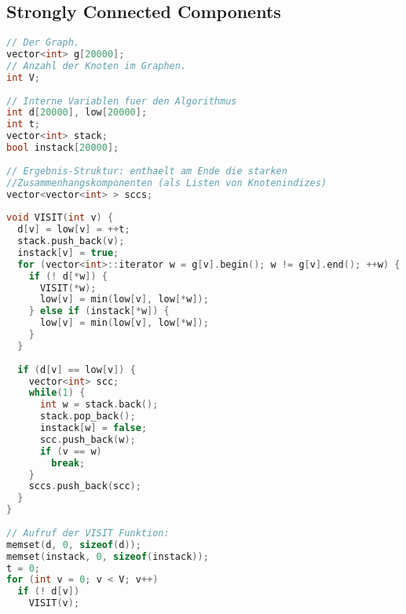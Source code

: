\subsection{Strongly Connected Components}
\begin{lstlisting}[language=C++]
// Der Graph.
vector<int> g[20000];
// Anzahl der Knoten im Graphen.
int V;
 
// Interne Variablen fuer den Algorithmus
int d[20000], low[20000];
int t;
vector<int> stack;
bool instack[20000];
 
// Ergebnis-Struktur: enthaelt am Ende die starken 
//Zusammenhangskomponenten (als Listen von Knotenindizes)
vector<vector<int> > sccs;
 
void VISIT(int v) {
  d[v] = low[v] = ++t;
  stack.push_back(v);
  instack[v] = true;
  for (vector<int>::iterator w = g[v].begin(); w != g[v].end(); ++w) {
    if (! d[*w]) {
      VISIT(*w);
      low[v] = min(low[v], low[*w]);
    } else if (instack[*w]) {
      low[v] = min(low[v], low[*w]);
    }
  }
 
  if (d[v] == low[v]) {
    vector<int> scc;
    while(1) {
      int w = stack.back();
      stack.pop_back();
      instack[w] = false;
      scc.push_back(w);
      if (v == w)
        break;
    }
    sccs.push_back(scc);
  }
}
 
// Aufruf der VISIT Funktion:
memset(d, 0, sizeof(d));
memset(instack, 0, sizeof(instack));
t = 0;
for (int v = 0; v < V; v++)
  if (! d[v])
    VISIT(v);
\end{lstlisting}
